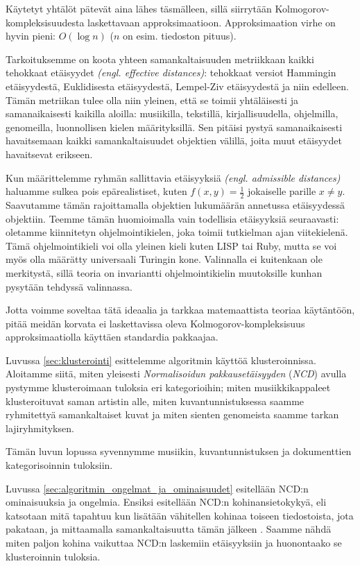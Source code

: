 \documentclass[12pt,finnish]{tktltiki2}
\theoremstyle{definition}
\theoremstyle{remark}
\newcommand{\engl}[1]{\emph{(engl. #1)}}
\begin{document}
  Käytetyt yhtälöt pätevät aina lähes täsmälleen, sillä siirrytään Kolmogorov-kompleksisuudesta laskettavaan approksimaatioon. Approksimaation virhe on hyvin pieni: $O(\log n)$ ($n$ on esim. tiedoston pituus).

  Tarkoituksemme on koota yhteen samankaltaisuuden metriikkaan kaikki tehokkaat etäisyydet \engl{effective distances}: tehokkaat versiot Hammingin etäisyydestä, Euklidisesta etäisyydestä, Lempel-Ziv etäisyydestä ja niin edelleen.
  Tämän metriikan tulee olla niin yleinen, että se toimii yhtäläisesti ja samanaikaisesti kaikilla aloilla: musiikilla, tekstillä, kirjallisuudella, ohjelmilla, genomeilla, luonnollisen kielen määrityksillä.
  Sen pitäisi pystyä samanaikaisesti havaitsemaan kaikki samankaltaisuudet objektien välillä, joita muut etäisyydet havaitsevat erikseen.

  Kun määrittelemme ryhmän sallittavia etäisyyksiä \engl{admissible distances} haluamme sulkea pois epärealistiset, kuten $f(x,y) = \frac{1}{2}$ jokaiselle parille $x \neq y$.
  Saavutamme tämän rajoittamalla objektien lukumäärän annetussa etäisyydessä objektiin.
  Teemme tämän huomioimalla vain todellisia etäisyyksiä seuraavasti: oletamme kiinnitetyn ohjelmointikielen, joka toimii tutkielman ajan viitekielenä.
  Tämä ohjelmointikieli voi olla yleinen kieli kuten LISP tai Ruby, mutta se voi myös olla määrätty universaali Turingin kone. \cite{CV05,cilibrasi2007google}
  Valinnalla ei kuitenkaan ole merkitystä, sillä teoria on invariantti ohjelmointikielin muutoksille kunhan pysytään tehdyssä valinnassa.


Jotta voimme soveltaa tätä ideaalia ja tarkkaa matemaattista teoriaa käytäntöön, pitää meidän korvata ei laskettavissa oleva Kolmogorov-kompleksisuus approksimaatiolla käyttäen standardia pakkaajaa.

\label{par:intro-3}
  Luvussa \ref{sec:klusterointi} esittelemme algoritmin käyttöä klusteroinnissa.
  Aloitamme siitä, miten yleisesti \emph{Normalisoidun pakkausetäisyyden} (\emph{NCD}) avulla pystymme klusteroimaan tuloksia eri kategorioihin; miten musiikkikappaleet klusteroituvat saman artistin alle, miten kuvantunnistuksessa saamme ryhmitettyä samankaltaiset kuvat ja miten sienten genomeista saamme tarkan lajiryhmityksen.

  Tämän luvun lopussa syvennymme musiikin, kuvantunnistuksen ja dokumenttien kategorisoinnin tuloksiin.


\label{par:intro-4}
  Luvussa \ref{sec:algoritmin_ongelmat_ja_ominaisuudet} esitellään NCD:n ominaisuuksia ja ongelmia.
  Ensiksi esitellään NCD:n kohinansietokykyä, eli katsotaan mitä tapahtuu kun lisätään vähitellen kohinaa toiseen tiedostoista, jota pakataan, ja mittaamalla samankaltaisuutta tämän jälkeen \cite{4167725}.
  Saamme nähdä miten paljon kohina vaikuttaa NCD:n laskemiin etäisyyksiin ja huonontaako se klusteroinnin tuloksia.
\end{document}
